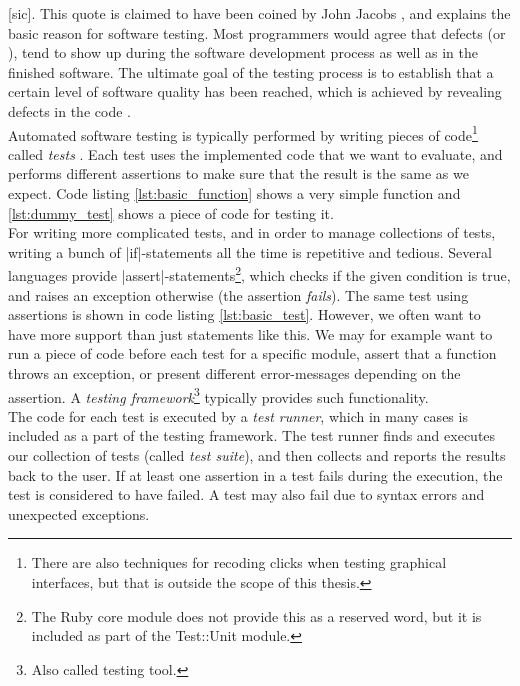 \MakeShortVerb{\|}

 [sic].
This quote is claimed to have been coined by John
Jacobs \cite{web:quote_jacobs}, and explains the basic reason for
software testing. Most programmers would agree that defects (or
), tend to show up during the software
development process as well as in the finished software. The ultimate
goal of the testing process is to establish that a certain level of
software quality has been reached, which is achieved by revealing
defects in the code \cite{book:adp}.\\

Automated software testing is typically performed by writing pieces of
code\footnote{There are also techniques for recoding clicks when testing
graphical interfaces, but that is outside the scope of this thesis.}
called \emph{tests} \cite{wiki:test_automation}. Each test uses the
implemented code that we want to evaluate, and performs different
assertions to make sure that the result is the same as we expect. Code
listing \ref{lst:basic_function} shows a very simple function and
\ref{lst:dummy_test} shows a piece of code for testing it.\\

For writing more complicated tests, and in order to manage collections
of tests, writing a bunch of |if|-statements all the time is repetitive
and tedious. Several languages provide |assert|-statements\footnote{The
Ruby core module does not provide this as a reserved word, but it is
included as part of the Test::Unit module.}, which checks if the given
condition is true, and raises an exception otherwise (the assertion
\emph{fails}). The same test using assertions is shown in code listing
\ref{lst:basic_test}. However, we often want to have more support than
just statements like this. We may for example want to run a piece of
code before each test for a specific module, assert that a function
throws an exception, or present different error-messages depending on
the assertion. A \emph{testing framework}\footnote{Also called testing
tool.} typically provides such
functionality.\cite{wiki:test_automation}\\

The code for each test is executed by a \emph{test runner}, which in
many cases is included as a part of the testing framework. The test
runner finds and executes our collection of tests (called \emph{test
suite}), and then collects and reports the results back to the user. If
at least one assertion in a test fails during the execution, the test is
considered to have failed. A test may also fail due to syntax errors and
unexpected exceptions.\\


